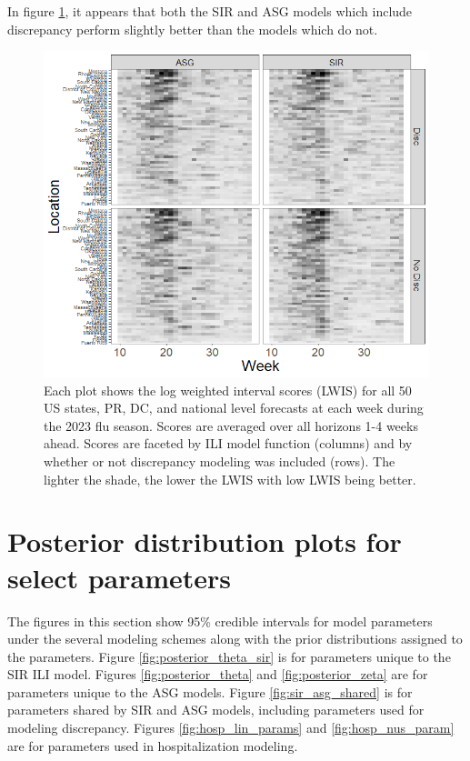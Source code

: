 \documentclass{article}
\begin{document}

In figure \ref{fig:lwis_by_traj_loc}, it appears that both the SIR and ASG models which include discrepancy perform slightly better than the models which do not.

\begin{figure}[hbt!]
    
    \centering
    \includegraphics[scale = .7]{Images/lwis_by_traj_loc.png}
    \caption{Each plot shows the log weighted interval scores (LWIS) for all 50 US states, PR, DC, and national level forecasts at each week during the 2023 flu season. Scores are averaged over all horizons 1-4 weeks ahead. Scores are faceted by ILI model function (columns) and by whether or not discrepancy modeling was included (rows). The lighter the shade, the lower the LWIS with low LWIS being better.}
    \label{fig:lwis_by_traj_loc}
\end{figure}



\section{Posterior distribution plots for select parameters}
\label{app:B_prior}

The figures in this section show 95\% credible intervals for model parameters under the several modeling schemes along with the prior distributions assigned to the parameters. Figure \ref{fig:posterior_theta_sir} is for parameters unique to the SIR ILI model. Figures \ref{fig:posterior_theta} and \ref{fig:posterior_zeta} are for parameters unique to the ASG models. Figure \ref{fig:sir_asg_shared} is for parameters shared by SIR and ASG models, including parameters used for modeling discrepancy. Figures \ref{fig:hosp_lin_params} and \ref{fig:hosp_nus_param} are for parameters used in hospitalization modeling.
\end{document}
